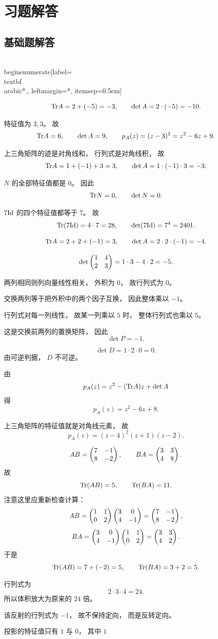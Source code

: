 \section*{习题解答}




\subsection*{基础题解答}




\\begin{enumerate}[label=\\textbf{\\arabic*.}, leftmargin=*, itemsep=0.5em] \item \[ \mathrm{Tr} A=2+(-5)=-3,\qquad \det A=2\cdot(-5)=-10. \] \item 特征值为 \(3,3\)。 故 \[ \mathrm{Tr} A=6,\qquad \det A=9,\qquad p_A(z)=(z-3)^2=z^2-6z+9. \] \item 上三角矩阵的迹是对角线和， 行列式是对角线积， 故 \[ \mathrm{Tr} A=1+(-1)+3=3,\qquad \det A=1\cdot(-1)\cdot3=-3. \] \item \(N\) 的全部特征值都是 \(0\)。 因此 \[ \mathrm{Tr} N=0,\qquad \det N=0. \] \item \(7\mathrm{Id}\) 的四个特征值都等于 \(7\)。 故 \[ \mathrm{Tr}(7\mathrm{Id})=4\cdot7=28,\qquad \det(7\mathrm{Id})=7^4=2401. \] \item \[ \mathrm{Tr} A=2+2+(-1)=3,\qquad \det A=2\cdot2\cdot(-1)=-4. \] \item \[ \det\begin{pmatrix} 1&4\\2&3 \end{pmatrix}=1\cdot3-4\cdot2=-5. \] \item 两列相同则列向量线性相关， 外积为 \(0\)， 故行列式为 \(0\)。 \item 交换两列等于把外积中的两个因子互换， 因此整体乘以 \(-1\)。 \item 行列式对每一列线性， 故某一列乘以 \(5\) 时， 整体行列式也乘以 \(5\)。 \item 这是交换前两列的置换矩阵， 因此 \[ \det P=-1. \] \item \[ \det D=1\cdot2\cdot0=0. \] 由可逆判据， \(D\) 不可逆。 \item 由 \[ p_A(z)=z^2-(\mathrm{Tr} A)z+\det A \] 得 \[ p_A(z)=z^2-6z+8. \] \item 上三角矩阵的特征值就是对角线元素， 故 \[ p_A(z)=(z-4)^2(z+1)(z-2). \] \item \[ AB=\begin{pmatrix} 7&-1\\8&-2 \end{pmatrix},\qquad BA=\begin{pmatrix} 3&3\\4&8 \end{pmatrix}. \] 故 \[ \mathrm{Tr}(AB)=5,\qquad \mathrm{Tr}(BA)=11. \] 注意这里应重新检查计算： \[ AB=\begin{pmatrix} 1&1\\0&2 \end{pmatrix}\begin{pmatrix} 3&0\\4&-1 \end{pmatrix}=\begin{pmatrix} 7&-1\\8&-2 \end{pmatrix}, \] \[ BA=\begin{pmatrix} 3&0\\4&-1 \end{pmatrix}\begin{pmatrix} 1&1\\0&2 \end{pmatrix}=\begin{pmatrix} 3&3\\4&2 \end{pmatrix}. \] 于是 \[ \mathrm{Tr}(AB)=7+(-2)=5,\qquad \mathrm{Tr}(BA)=3+2=5. \] \item 行列式为 \[ 2\cdot3\cdot4=24. \] 所以体积放大为原来的 \(24\) 倍。 \item 该反射的行列式为 \(-1\)， 故不保持定向， 而是反转定向。 \item 投影的特征值只有 \(1\) 与 \(0\)， 其中 \(1\) 